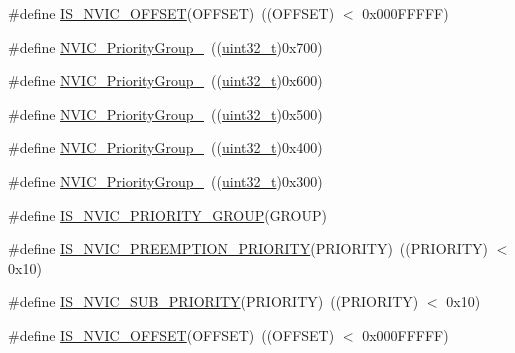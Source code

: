 \begin{DoxyCompactItemize}
\item 
\#define \hyperlink{group___preemption___priority___group_ga1184bbb97d758385f98ab40dd5e5af59}{I\+S\+\_\+\+N\+V\+I\+C\+\_\+\+O\+F\+F\+S\+ET}(O\+F\+F\+S\+ET)~((O\+F\+F\+S\+ET) $<$ 0x000\+F\+F\+F\+F\+F)
\item 
\#define \hyperlink{group___preemption___priority___group_gaeac0cf537f65d17bc19aee2410b2b60e}{N\+V\+I\+C\+\_\+\+Priority\+Group\+\_}~((\hyperlink{_p_e___types_8h_a33594304e786b158f3fb30289278f5af}{uint32\+\_\+t})0x700)
\item 
\#define \hyperlink{group___preemption___priority___group_ga89bf0bf9e70f1a372a541b1b8d7493aa}{N\+V\+I\+C\+\_\+\+Priority\+Group\+\_}~((\hyperlink{_p_e___types_8h_a33594304e786b158f3fb30289278f5af}{uint32\+\_\+t})0x600)
\item 
\#define \hyperlink{group___preemption___priority___group_ga505002e8b76aef65499ca371e40ec8b4}{N\+V\+I\+C\+\_\+\+Priority\+Group\+\_}~((\hyperlink{_p_e___types_8h_a33594304e786b158f3fb30289278f5af}{uint32\+\_\+t})0x500)
\item 
\#define \hyperlink{group___preemption___priority___group_ga49bdbee77d4a70339d63c80462d49b4d}{N\+V\+I\+C\+\_\+\+Priority\+Group\+\_}~((\hyperlink{_p_e___types_8h_a33594304e786b158f3fb30289278f5af}{uint32\+\_\+t})0x400)
\item 
\#define \hyperlink{group___preemption___priority___group_gaf9020c585da2a299328f0b06dee391a2}{N\+V\+I\+C\+\_\+\+Priority\+Group\+\_}~((\hyperlink{_p_e___types_8h_a33594304e786b158f3fb30289278f5af}{uint32\+\_\+t})0x300)
\item 
\#define \hyperlink{group___preemption___priority___group_ga6569304a39fe4f91bd59b6a586c8ede9}{I\+S\+\_\+\+N\+V\+I\+C\+\_\+\+P\+R\+I\+O\+R\+I\+T\+Y\+\_\+\+G\+R\+O\+UP}(G\+R\+O\+UP)
\item 
\#define \hyperlink{group___preemption___priority___group_gaf30fd8f5960c2e28a772d8f16bb156dd}{I\+S\+\_\+\+N\+V\+I\+C\+\_\+\+P\+R\+E\+E\+M\+P\+T\+I\+O\+N\+\_\+\+P\+R\+I\+O\+R\+I\+TY}(P\+R\+I\+O\+R\+I\+TY)~((P\+R\+I\+O\+R\+I\+TY) $<$ 0x10)
\item 
\#define \hyperlink{group___preemption___priority___group_ga010705bc997dcff935b965b372cba61d}{I\+S\+\_\+\+N\+V\+I\+C\+\_\+\+S\+U\+B\+\_\+\+P\+R\+I\+O\+R\+I\+TY}(P\+R\+I\+O\+R\+I\+TY)~((P\+R\+I\+O\+R\+I\+TY) $<$ 0x10)
\item 
\#define \hyperlink{group___preemption___priority___group_ga1184bbb97d758385f98ab40dd5e5af59}{I\+S\+\_\+\+N\+V\+I\+C\+\_\+\+O\+F\+F\+S\+ET}(O\+F\+F\+S\+ET)~((O\+F\+F\+S\+ET) $<$ 0x000\+F\+F\+F\+F\+F)
\end{DoxyCompactItemize}



